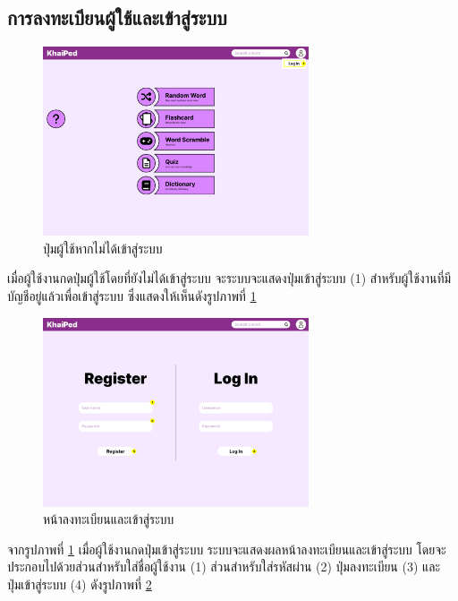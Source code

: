 \documentclass[12pt,oneside,openright,a4paper]{cpe-thai-project}
\begin{document}
\pagebreak
\subsection{การลงทะเบียนผู้ใช้และเข้าสู่ระบบ}
\begin{figure}[!h]\centering
	\includegraphics[width=0.7\textwidth, keepaspectratio=true]{image/chap3/ui/login/Home page - Guest User Button.png}
	\caption{ปุ่มผู้ใช้หากไม่ได้เข้าสู่ระบบ}\label{fig:UI_GuestButton}
\end{figure}
\hspace{1cm}
เมื่อผู้ใช้งานกดปุ่มผู้ใช้โดยที่ยังไม่ได้เข้าสู่ระบบ จะระบบจะแสดงปุ่มเข้าสู่ระบบ (1) สำหรับผู้ใช้งานที่มีบัญชีอยู่แล้วเพื่อเข้าสู่ระบบ
ซึ่งแสดงให้เห็นดังรูปภาพที่ \ref{fig:UI_GuestButton}


\begin{figure}[!h]\centering
	\includegraphics[width=0.7\textwidth, keepaspectratio=true]{image/chap3/ui/login/Home page - Register.png}
	\caption{หน้าลงทะเบียนและเข้าสู่ระบบ}\label{fig:UI_LoginPage}
\end{figure}
\hspace{1cm}
จากรูปภาพที่ \ref{fig:UI_GuestButton} เมื่อผู้ใช้งานกดปุ่มเข้าสู่ระบบ ระบบจะแสดงผลหน้าลงทะเบียนและเข้าสู่ระบบ โดยจะประกอบไปด้วยส่วนสำหรับใส่ชื่อผู้ใช้งาน (1)
ส่วนสำหรับใส่รหัสผ่าน (2) ปุ่มลงทะเบียน (3) และ ปุ่มเข้าสู่ระบบ (4) ดังรูปภาพที่ \ref{fig:UI_LoginPage}
\end{document}
